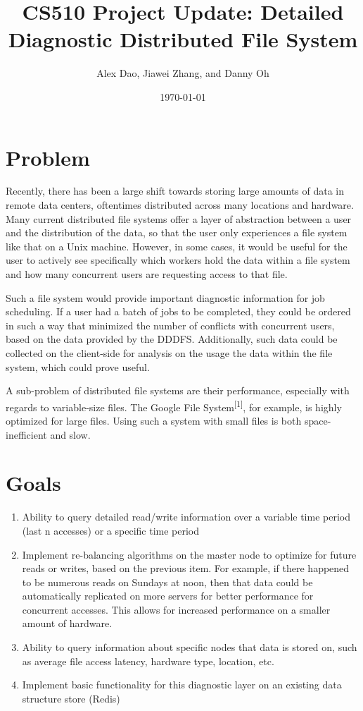 \documentclass{article}
\title{CS510 Project Update: Detailed Diagnostic Distributed File System}
\date{\today}
\author{Alex Dao, Jiawei Zhang, and Danny Oh}
\begin{document}
\maketitle

\section{Problem}
Recently, there has been a large shift towards storing large amounts of data in remote data centers, oftentimes distributed across many locations and hardware. Many current distributed file systems offer a layer of abstraction between a user and the distribution of the data, so that the user only experiences a file system like that on a Unix machine. However, in some cases, it would be useful for the user to actively see specifically which workers hold the data within a file system and how many concurrent users are requesting access to that file. 

Such a file system would provide important diagnostic information for job scheduling. If a user had a batch of jobs to be completed, they could be ordered in such a way that minimized the number of conflicts with concurrent users, based on the data provided by the DDDFS. Additionally, such data could be collected on the client-side for analysis on the usage the data within the file system, which could prove useful.

A sub-problem of distributed file systems are their performance, especially with regards to variable-size files. The Google File System\textsuperscript{[1]}, for example, is highly optimized for large files. Using such a system with small files is both space-inefficient and slow. 

\section{Goals}
\begin{enumerate}
\item Ability to query detailed read/write information over a variable time period (last n accesses) or a specific time period
\item Implement re-balancing algorithms on the master node to optimize for future reads or writes, based on the previous item. For example, if there happened to be numerous reads on Sundays at noon, then that data could be automatically replicated on more servers for better performance for concurrent accesses. This allows for increased performance on a smaller amount of hardware. 
\item Ability to query information about specific nodes that data is stored on, such as average file access latency, hardware type, location, etc. 
\item Implement basic functionality for this diagnostic layer on an existing data structure store (Redis)
\end{enumerate}
\end{document}
